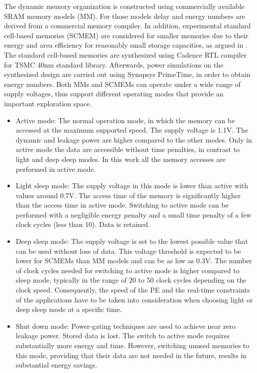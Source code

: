 The dynamic memory organization is constructed using commercially available SRAM memory models (MM).
For those models delay and energy numbers are derived from a commercial memory compiler.
In addition, experimental standard cell-based memories (SCMEM) \cite{Mei11}  are  considered for smaller memories due to their energy and area efficiency for reasonably small storage capacities, as argued in \cite{Mei10}. 
The standard cell-based memories are synthesized using Cadence RTL compiler for TSMC 40nm standard library. 
Afterwards, power simulations on the synthesized design are carried out using Synopsys PrimeTime, in order to obtain energy numbers.
Both MMs and SCMEMs can operate under a wide range of supply voltages, thus support different operating modes that provide an important exploration space.
\begin{itemize}
\item Active mode: The normal operation mode, in which the memory can be accessed at the maximum supported speed. The supply voltage is 1.1V. 
The dynamic and leakage power are higher compared to the other modes.
Only in active mode the data are accessible without time penalties, in contrast to light and deep sleep modes.
In this work all the memory accesses are performed in active mode. 
\item Light sleep mode: The supply voltage in this mode is lower than active with values around 0.7V. 
The access time of the memory is significantly higher than the access time in active mode. 
Switching to active mode can be performed with a negligible energy penalty and a small time penalty of a few clock cycles (less than 10). 
Data is retained.  
\item Deep sleep mode: The supply voltage is set to the lowest possible value that can be used without loss of data. 
This voltage threshold is expected to be lower for SCMEMs than MM models and can be as low as 0.3V. 
The number of clock cycles needed for switching to active mode is higher compared to sleep mode, typically in the range of 20 to 50 clock cycles depending on the clock speed. 
Consequently, the speed of the PE and the real-time constraints of the applications have to be taken into consideration when choosing light or deep sleep mode at a specific time.  
\item Shut down mode: Power-gating techniques are used to achieve near zero leakage power. 
Stored data is lost. 
The switch to active mode requires substantially more energy and time. 
However, switching unused memories to this mode, providing that their data are not needed in the future, results in substantial energy savings.
\end{itemize}  

